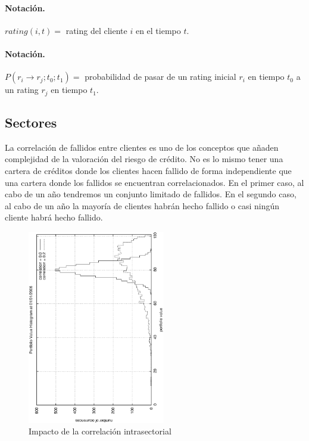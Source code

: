 \paragraph{Notaci\'on.} $rating(i,t) =$ rating del cliente $i$ en el tiempo $t$.

\paragraph{Notaci\'on.} $P(r_i \to r_j;t_0;t_1) =$ probabilidad de pasar de un 
rating inicial $r_i$ en tiempo $t_0$ a un rating $r_j$ en tiempo $t_1$.


\subsection{Sectores}

La correlaci\'on de fallidos entre clientes es uno de los conceptos que
a\~naden complejidad de la valoraci\'on del riesgo de cr\'edito. No es lo
mismo tener una cartera de cr\'editos donde los clientes hacen fallido 
de forma independiente que una cartera donde los fallidos se encuentran 
correlacionados. En el primer caso, al cabo de un a\~no tendremos un 
conjunto limitado de fallidos. En el segundo caso, al cabo de un a\~no la 
mayor\'ia de clientes habr\'an hecho fallido o casi ning\'un cliente habr\'a
hecho fallido.

\begin{figure}[!hb]
\begin{center}
\includegraphics[width=6cm,angle=-90]{./images/sectorcorrel.ps}
\caption{Impacto de la correlaci\'on intrasectorial}
\label{sectorcorrel}
\end{center}
\end{figure}

